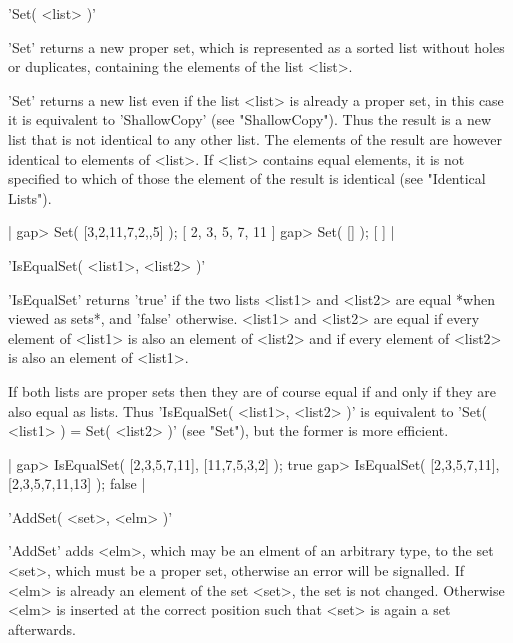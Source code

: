 %

'Set( <list> )'

'Set' returns a  new proper  set, which  is represented as  a sorted list
without holes or duplicates, containing the elements of the list <list>.

'Set' returns a new list even if the list <list> is already a proper set,
in this  case  it is   equivalent to  'ShallowCopy' (see  "ShallowCopy").
Thus the result is  a new list  that is not  identical to any other list.
The elements of  the result are however identical  to elements of <list>.
If <list> contains equal elements, it is  not specified to which of those
the element of the result is identical (see "Identical Lists").

|    gap> Set( [3,2,11,7,2,,5] );
    [ 2, 3, 5, 7, 11 ]
    gap> Set( [] );
    [  ] |

%

'IsEqualSet( <list1>, <list2> )'

'IsEqualSet' returns  'true' if the   two lists <list1>  and <list2>  are
equal *when viewed as sets*, and  'false' otherwise.  <list1> and <list2>
are equal if  every element of <list1> is  also an element of <list2> and
if every element of <list2> is also an element of <list1>.

If both lists are proper sets then they are of course  equal if  and only
if they are also equal as  lists.  Thus  'IsEqualSet( <list1>, <list2> )'
is equivalent to 'Set( <list1>  ) = Set( <list2> )'  (see "Set"), but the
former is more efficient.

|    gap> IsEqualSet( [2,3,5,7,11], [11,7,5,3,2] );
    true
    gap> IsEqualSet( [2,3,5,7,11], [2,3,5,7,11,13] );
    false |

%

'AddSet( <set>, <elm> )'

'AddSet' adds <elm>, which may be an elment of an  arbitrary type, to the
set   <set>, which must  be  a proper  set,  otherwise an  error  will be
signalled.  If <elm> is already an element of the  set <set>, the  set is
not  changed.  Otherwise <elm> is inserted  at the  correct position such
that <set> is again a set afterwards.

